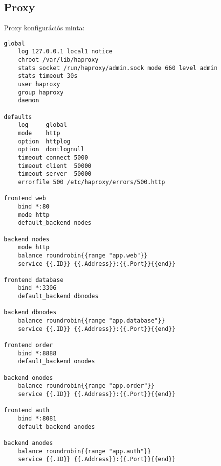\subsection{\texorpdfstring{Proxy\label{appendix-template}}{Proxy}}\label{proxy-1}

Proxy konfigurációs minta:

\begin{verbatim}
global
    log 127.0.0.1 local1 notice
    chroot /var/lib/haproxy
    stats socket /run/haproxy/admin.sock mode 660 level admin
    stats timeout 30s
    user haproxy
    group haproxy
    daemon

defaults
    log     global
    mode    http
    option  httplog
    option  dontlognull
    timeout connect 5000
    timeout client  50000
    timeout server  50000
    errorfile 500 /etc/haproxy/errors/500.http

frontend web
    bind *:80
    mode http
    default_backend nodes

backend nodes
    mode http
    balance roundrobin{{range "app.web"}}
    service {{.ID}} {{.Address}}:{{.Port}}{{end}}

frontend database
    bind *:3306
    default_backend dbnodes

backend dbnodes
    balance roundrobin{{range "app.database"}}
    service {{.ID}} {{.Address}}:{{.Port}}{{end}}

frontend order
    bind *:8888
    default_backend onodes

backend onodes
    balance roundrobin{{range "app.order"}}
    service {{.ID}} {{.Address}}:{{.Port}}{{end}}

frontend auth
    bind *:8081
    default_backend anodes

backend anodes
    balance roundrobin{{range "app.auth"}}
    service {{.ID}} {{.Address}}:{{.Port}}{{end}}
\end{verbatim}
